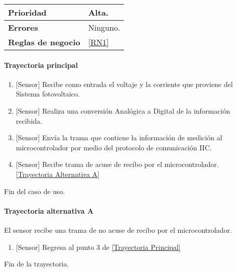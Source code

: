\begin{longtable}{|J{5cm}|J{10.3cm}|}
	\textbf{Prioridad} & 
		Alta. \\ \hline
	\textbf{Errores} & Ninguno.
		\\ \hline
	\textbf{Reglas de negocio} & \ref{RN1}
		 \\ \hline
\end{longtable}

\paragraph{Trayectoria principal}
\label{SUB-M-CU1.3:TP}
	\begin{enumerate}
		\item {[Sensor]} Recibe como entrada el voltaje y la corriente que proviene del Sistema fotovoltaico.
		\item {[Sensor]} Realiza una conversión Analógica a Digital de la información recibida. 
		\item {[Sensor]} Envía la trama que contiene la información de medición al microcontrolador por medio del protocolo de comunicación IIC.
		\item {[Sensor]} Recibe trama de acuse de recibo por el microcontrolador. \hyperref[SUB-M-CU1.3:TA]{[Trayectoria Alternativa A]}
	\end{enumerate}
	Fin del caso de uso.

\paragraph{Trayectoria alternativa A} \label{SUB-M-CU1.3:TA}
	El sensor recibe una trama de no acuse de recibo por el microcontrolador.
	\begin{enumerate}[label=A\arabic*.]
		\item {[Sensor]} Regresa al punto 3 de \hyperref[SUB-M-CU1.3:TP]{[Trayectoria Principal]}  
	\end{enumerate}
	Fin de la trayectoria.
